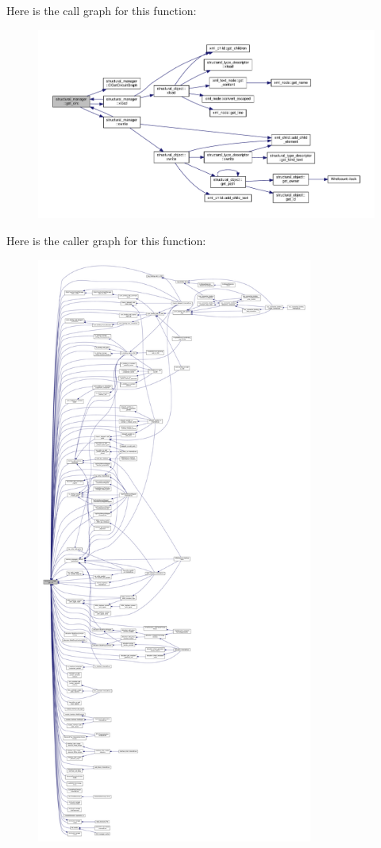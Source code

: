 Here is the call graph for this function\+:
\nopagebreak
\begin{figure}[H]
\begin{center}
\leavevmode
\includegraphics[width=350pt]{d7/d6b/classstructural__manager_a56ff3164d2a57d12312fa3c7bfceb244_cgraph}
\end{center}
\end{figure}
Here is the caller graph for this function\+:
\nopagebreak
\begin{figure}[H]
\begin{center}
\leavevmode
\includegraphics[height=550pt]{d7/d6b/classstructural__manager_a56ff3164d2a57d12312fa3c7bfceb244_icgraph}
\end{center}
\end{figure}

